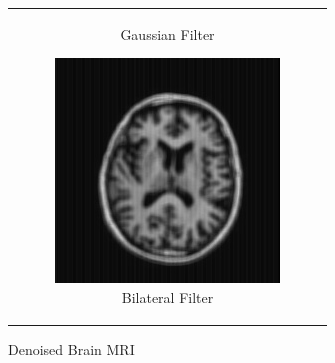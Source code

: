 \documentclass[hidelinks,12pt]{article}
\begin{document}
\begin{figure}[!h]
\begin{tabular}{c}
\begin{subfigure}[h]{0.3\textwidth}
				\caption{Gaussian Filter}
			\end{subfigure}
			\hfill
			\begin{subfigure}[h]{0.3\textwidth}
				\centering
				\includegraphics[width=\textwidth]{figures/brain_mri/bilateral.jpg}
				\caption{Bilateral Filter}
			\end{subfigure}
		\end{tabular}
		\caption{Denoised Brain MRI}
	\end{figure}
	
\end{document}
